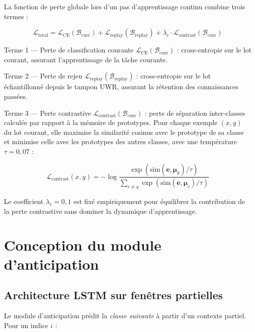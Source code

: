 \documentclass[a4paper,12pt]{report}
\begin{document}
La fonction de perte globale lors d'un pas d'apprentissage continu combine trois termes :

$$\mathcal{L}_{\mathrm{total}} = \mathcal{L}_{\mathrm{CE}}(\mathcal{B}_{\mathrm{curr}}) + \mathcal{L}_{\mathrm{replay}}(\mathcal{B}_{\mathrm{replay}}) + \lambda_c \cdot \mathcal{L}_{\mathrm{contrast}}(\mathcal{B}_{\mathrm{curr}})$$

Terme 1 — Perte de classification courante $\mathcal{L}_{\mathrm{CE}}(\mathcal{B}_{\mathrm{curr}})$ : cross-entropie sur le lot courant, assurant l'apprentissage de la tâche courante.

Terme 2 — Perte de rejeu $\mathcal{L}_{\mathrm{replay}}(\mathcal{B}_{\mathrm{replay}})$ : cross-entropie sur le lot échantillonné depuis le tampon UWR, assurant la rétention des connaissances passées.

Terme 3 — Perte contrastive $\mathcal{L}_{\mathrm{contrast}}(\mathcal{B}_{\mathrm{curr}})$ : perte de séparation inter-classes calculée par rapport à la mémoire de prototypes. Pour chaque exemple $(x, y)$ du lot courant, elle maximise la similarité cosinus avec le prototype de sa classe et minimise celle avec les prototypes des autres classes, avec une température $\tau = 0{,}07$ :

$$\mathcal{L}_{\mathrm{contrast}}(x, y) = -\log \frac{\exp(\mathrm{sim}(\boldsymbol{e}, \boldsymbol{\mu}_y) / \tau)}{\sum_{c \neq y} \exp(\mathrm{sim}(\boldsymbol{e}, \boldsymbol{\mu}_c) / \tau)}$$

Le coefficient $\lambda_c = 0{,}1$ est fixé empiriquement pour équilibrer la contribution de la perte contrastive sans dominer la dynamique d'apprentissage.

\section{Conception du module d'anticipation}

\subsection{Architecture LSTM sur fenêtres partielles}

Le module d'anticipation prédit la \emph{classe suivante} à partir d'un
contexte partiel. Pour un indice $i$ :
\end{document}

